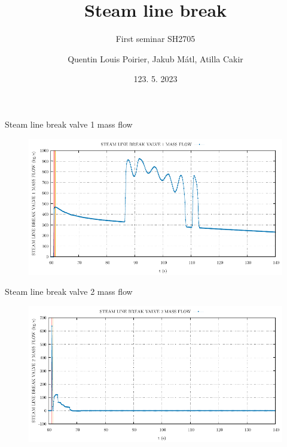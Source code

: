 

\title[APROS simulations of BWR transients]{Steam line break}
\subtitle{First seminar SH2705}
\author{Quentin Louis Poirier, Jakub Mátl, Atilla Cakir}
\date[24/05/23]{123. 5. 2023}
\usepackage{comment}

\usepackage[style=authoryear-ibid,backend=biber]{biblatex}
\usepackage{pgfplots}
\pgfplotsset{compat=1.18}



\nologo %




\frame{\titlepage}

\begin{frame}{Steam line break valve 1 mass flow}
	\begin{figure}
		\centering
		\includegraphics[width=\textwidth]{./02SteamLineBreak/graphs/STEAM LINE BREAK VALVE 1 MASS FLOW.pdf}
		
	\end{figure}
\end{frame}

\begin{frame}{Steam line break valve 2 mass flow}
	\begin{figure}
		\centering
		\includegraphics[width=\textwidth]{./02SteamLineBreak/graphs/STEAM LINE BREAK VALVE 2 MASS FLOW.pdf}
		
	\end{figure}
\end{frame}

